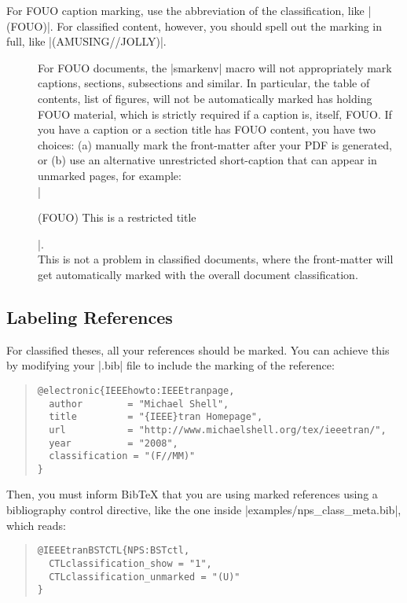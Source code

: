 For FOUO caption marking, use the abbreviation of the classification, like |(FOUO)|.
For classified content, however, you should spell out the marking in full, like |(AMUSING//JOLLY)|.

\begin{description}
\item[]
For FOUO documents, the |smarkenv| macro will not appropriately mark
captions, sections, subsections and similar.
In particular, the table of contents, list of figures, \etc will not be automatically
marked has holding FOUO material, which is strictly required if a caption is, itself, FOUO. 
If you have a caption or a section title has FOUO content, you have two choices:
(a) manually mark the front-matter after your PDF is generated, or 
(b) use an alternative unrestricted short-caption that can appear 
in unmarked pages, for example:\\
 |\caption[Redacted Caption.]{(FOUO) This is a restricted title}|.\\
This is not a problem in classified documents, where the front-matter 
will get automatically marked with the overall document classification.
\end{description}

\subsection{Labeling References}
For classified theses, all your references should be marked. You can achieve this
by modifying your |.bib| file to include the marking of the reference:

\begin{quotation}
\begin{Verbatim}
@electronic{IEEEhowto:IEEEtranpage,
  author        = "Michael Shell",
  title         = "{IEEE}tran Homepage",
  url           = "http://www.michaelshell.org/tex/ieeetran/",
  year          = "2008",
  classification = "(F//MM)"
}
\end{Verbatim}
\end{quotation}

Then, you must inform Bib\TeX{} that you are using marked references using
a bibliography control directive, like the one inside |examples/nps_class_meta.bib|,
which reads:
\begin{quotation}
\begin{Verbatim}
@IEEEtranBSTCTL{NPS:BSTctl,
  CTLclassification_show = "1",
  CTLclassification_unmarked = "(U)"
}
\end{Verbatim}
\end{quotation}

